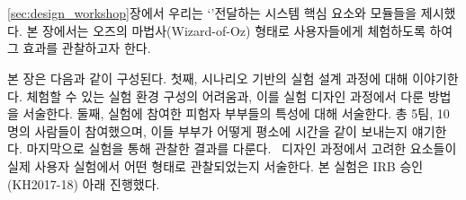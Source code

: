 \chapter{\expUser}
\label{sec:userstudy}

\ref{sec:design_workshop}장에서 우리는 `\concept'\를 전달하는 시스템  핵심 요소와 모듈들을 제시했다. 본 장에서는 \sysname\을 오즈의 마법사(Wizard-of-Oz) 형태로 사용자들에게 체험하도록 하여 그 효과를 관찰하고자 한다.

본 장은 다음과 같이 구성된다. 첫째, 시나리오 기반의 실험 설계 과정에 대해 이야기한다. \concept\를 체험할 수 있는 실험 환경 구성의 어려움과, 이를 실험 디자인 과정에서 다룬 방법을 서술한다. 둘째, 실험에 참여한 피험자 부부들의 특성에 대해 서술한다. 총 5팀, 10명의 사람들이 참여했으며, 이들 부부가 어떻게 평소에 시간을 같이 보내는지 얘기한다. 마지막으로 실험을 통해 관찰한 결과를 다룬다. \sysname\ 디자인 과정에서 고려한 요소들이 실제 사용자 실험에서 어떤 형태로 관찰되었는지 서술한다. 본 실험은 IRB 승인(KH2017-18) 아래 진행했다.



